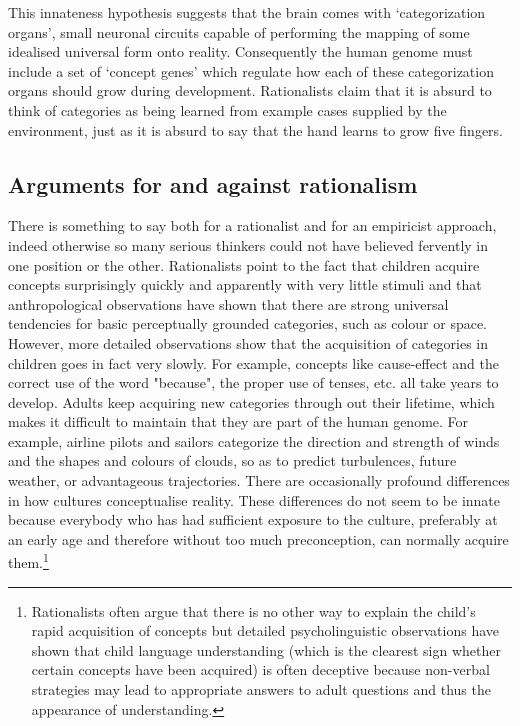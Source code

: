 This innateness hypothesis suggests that the brain comes
with `categorization organs', small neuronal circuits
capable of performing 
the mapping of some idealised universal form onto
reality. Consequently the human genome
must include a set of `concept genes' which regulate how each of 
these categorization organs should grow during 
development. Rationalists claim
that it is absurd to think of categories as being 
learned from example cases supplied by the environment, just 
as it is absurd to say that the hand learns to 
grow five fingers.

\subsection{Arguments for and against rationalism}

There is something to say both for a rationalist and 
for an empiricist approach, indeed otherwise so many
serious thinkers could not have believed fervently 
in one position or the other. Rationalists point to the 
fact that children acquire concepts
surprisingly quickly and apparently with very little stimuli
and that anthropological observations have 
shown that there are strong universal tendencies
for basic perceptually grounded categories, such as colour or 
space. However, more detailed observations show
that the acquisition of categories in children goes 
in fact very slowly. For example, concepts like cause-effect
and the correct use of the word "because", the proper
use of tenses, etc. all take years to develop. 
Adults keep acquiring
new categories through out their lifetime, which makes 
it difficult to maintain that they are part of the 
human genome. For example, 
airline pilots and sailors categorize the direction and 
strength of winds and the shapes and colours of clouds, 
so as to predict turbulences, future weather, or 
advantageous trajectories. There are
occasionally profound differences in how cultures conceptualise
reality. These differences do not seem to be innate because
everybody who has had sufficient exposure to the 
culture, preferably at an early age and therefore without too much 
preconception, can normally acquire them.\footnote{
Rationalists often argue that there is no other way 
to explain the child's rapid acquisition of concepts
but detailed psycholinguistic observations have shown that 
child language understanding (which is the 
clearest sign whether certain concepts have been acquired)
is often deceptive because 
non-verbal strategies may lead to appropriate answers
to adult questions and thus the appearance of 
understanding.}

